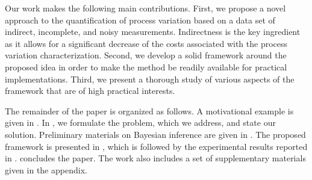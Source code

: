 Our work makes the following main contributions. First, we propose a novel approach to the quantification of process variation based on a data set of indirect, incomplete, and noisy measurements. Indirectness is the key ingredient as it allows for a significant decrease of the costs associated with the process variation characterization.
Second, we develop a solid framework around the proposed idea in order to make the method be readily available for practical implementations. Third, we present a thorough study of various aspects of the framework that are of high practical interests.

The remainder of the paper is organized as follows. A motivational example is given in . In , we formulate the problem, which we address, and state our solution. Preliminary materials on Bayesian inference are given in . The proposed framework is presented in , which is followed by the experimental results reported in .  concludes the paper. The work also includes a set of supplementary materials given in the appendix.
